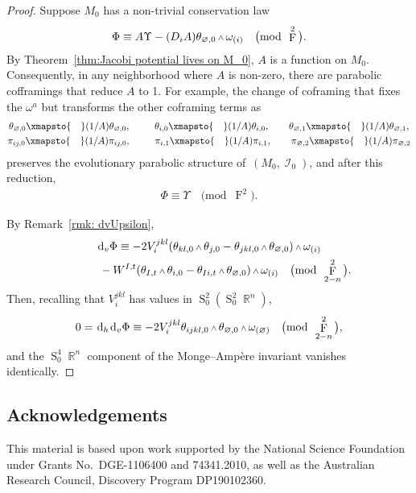 \documentclass[10pt,a4paper]{amsart}
\DeclareMathOperator{\R}{\mathbb{R}}
\DeclareMathOperator{\Sym}{S}
\DeclareMathOperator{\I}{\mathcal{I}}
\renewcommand{\d}{{\rm d}}
\renewcommand{\mod}[1]{\quad\big(\mathrm{mod\enspace} #1\big)}
\newcommand{\w}{{\mathchoice{\,{\scriptstyle\wedge}\,}{{\scriptstyle\wedge}}
 {{\scriptscriptstyle\wedge}}{{\scriptscriptstyle\wedge}}}}
\newcommand{\thetas}[1]{\theta_{#1}}
\newcommand{\thetanot}{\thetas{\varnothing,0}}
\newcommand{\pis}[1]{\pi_{#1}}
\newcommand{\omegas}[1]{\omega_{(#1)}}
\DeclareMathOperator{\pwf}{F}
\renewcommand{\dh}{\ensuremath{\hspace{1pt} \d_h}}
\newcommand{\dv}{\ensuremath{\hspace{1pt} \d_v}}
\numberwithin{equation}{section}
\begin{document}
\begin{proof}
 Suppose $M_0$ has a non-trivial conservation law
 \begin{gather*}
 \Phi \equiv A\Upsilon - (D_i A)\thetas{\varnothing,0}\w\omegas{i} \mod{\pwf^2} .
 \end{gather*}
 By Theorem~\ref{thm:Jacobi potential lives on M_0}, $A$ is a function on $M_0$. Consequently, in any neighborhood where $A$ is non-zero, there are parabolic cofframings that reduce $A$ to 1. For example, the change of coframing that fixes the $\omega^a$ but transforms the other coframing terms as
 \begin{gather*}
 \thetas{\varnothing,0} \xmapsto{\quad} (1/A)\thetas{\varnothing,0},\qquad\ \,
 \thetas{i,0} \xmapsto{\quad} (1/A)\thetas{i,0}, \qquad
 \thetas{\varnothing,1} \xmapsto{\quad} (1/A)\thetas{\varnothing,1} ,
 \\
 \pis{ij,0} \xmapsto{\quad} (1/A)\pis{ij,0}, \qquad\ \,
 \pis{i,1} \xmapsto{\quad} (1/A)\pis{i,1}, \qquad
 \pis{\varnothing,2} \xmapsto{\quad} (1/A)\pis{\varnothing,2}
 \end{gather*}
 preserves the evolutionary parabolic structure of~$(M_0,\I_0)$, and after this reduction,
 \begin{gather*}
 \Phi \equiv \Upsilon \mod{\pwf^2} .
 \end{gather*}

 By Remark~\ref{rmk: dvUpsilon},
 \begin{gather*}
 \dv\Phi \equiv - 2V_i^{jkl}(\thetas{kl,0}\w\thetas{j,0} - \thetas{jkl,0}\w\thetanot)\w\omegas{i}
 \\ \hphantom{\dv\Phi \equiv}
{} - W^{I,t}(\thetas{I,t}\w\thetas{i,0} - \thetas{Ii,t}\w\thetanot)\w\omegas{i}
 \mod{\pwf^2_{2-n}} .
 \end{gather*}
 Then, recalling that $V_i^{jkl}$ has values in $\Sym_0^2 (\Sym_0^2 \R^n)$,
 \begin{gather*}
 0 = \dh\dv\Phi \equiv -2V_i^{jkl}\thetas{ijkl,0}\w\thetanot\w\omegas{\varnothing} \mod{\pwf^2_{2-n}} ,
 \end{gather*}
 and the $\Sym_0^4 \R^n$ component of the Monge--Amp\`ere invariant vanishes identically.
\end{proof}


\subsection*{Acknowledgements}
This material is based upon work supported by the National Science Foundation under Grants No.~DGE-1106400 and 74341.2010, as well as the Australian Research Council, Discovery Program DP190102360.
\end{document}
